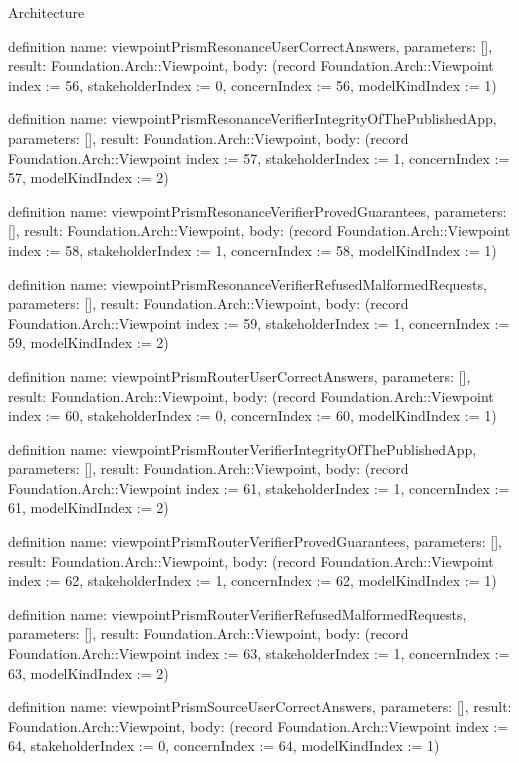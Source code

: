 \begin{lexlean}{Architecture}
\begin{semanticmodule}
definition{
  name: viewpointPrismResonanceUserCorrectAnswers,
  parameters: [],
  result: Foundation.Arch::Viewpoint,
  body: (record Foundation.Arch::Viewpoint {index := 56, stakeholderIndex := 0, concernIndex := 56, modelKindIndex := 1})
}

definition{
  name: viewpointPrismResonanceVerifierIntegrityOfThePublishedApp,
  parameters: [],
  result: Foundation.Arch::Viewpoint,
  body: (record Foundation.Arch::Viewpoint {index := 57, stakeholderIndex := 1, concernIndex := 57, modelKindIndex := 2})
}

definition{
  name: viewpointPrismResonanceVerifierProvedGuarantees,
  parameters: [],
  result: Foundation.Arch::Viewpoint,
  body: (record Foundation.Arch::Viewpoint {index := 58, stakeholderIndex := 1, concernIndex := 58, modelKindIndex := 1})
}

definition{
  name: viewpointPrismResonanceVerifierRefusedMalformedRequests,
  parameters: [],
  result: Foundation.Arch::Viewpoint,
  body: (record Foundation.Arch::Viewpoint {index := 59, stakeholderIndex := 1, concernIndex := 59, modelKindIndex := 2})
}

definition{
  name: viewpointPrismRouterUserCorrectAnswers,
  parameters: [],
  result: Foundation.Arch::Viewpoint,
  body: (record Foundation.Arch::Viewpoint {index := 60, stakeholderIndex := 0, concernIndex := 60, modelKindIndex := 1})
}

definition{
  name: viewpointPrismRouterVerifierIntegrityOfThePublishedApp,
  parameters: [],
  result: Foundation.Arch::Viewpoint,
  body: (record Foundation.Arch::Viewpoint {index := 61, stakeholderIndex := 1, concernIndex := 61, modelKindIndex := 2})
}

definition{
  name: viewpointPrismRouterVerifierProvedGuarantees,
  parameters: [],
  result: Foundation.Arch::Viewpoint,
  body: (record Foundation.Arch::Viewpoint {index := 62, stakeholderIndex := 1, concernIndex := 62, modelKindIndex := 1})
}

definition{
  name: viewpointPrismRouterVerifierRefusedMalformedRequests,
  parameters: [],
  result: Foundation.Arch::Viewpoint,
  body: (record Foundation.Arch::Viewpoint {index := 63, stakeholderIndex := 1, concernIndex := 63, modelKindIndex := 2})
}

definition{
  name: viewpointPrismSourceUserCorrectAnswers,
  parameters: [],
  result: Foundation.Arch::Viewpoint,
  body: (record Foundation.Arch::Viewpoint {index := 64, stakeholderIndex := 0, concernIndex := 64, modelKindIndex := 1})
}


\end{semanticmodule}
\end{lexlean}
